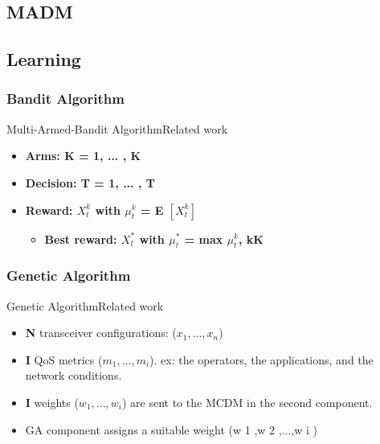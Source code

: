 \subsection{MADM}




\subsection{Learning}

\subsubsection{Bandit Algorithm}

\begin{frame}{Multi-Armed-Bandit Algorithm}{Related work}
\begin{itemize}
	\item \bf{Arms:} K = {1, ... , K}
	\item \bf{Decision:} T = {1, ... , T}
	\item \bf{Reward:} $X^{k}_{t}$ with $\mu^{k}_{t}$ = E $[X^{k}_{t}]$
	\begin{itemize}
		\item \bf{Best reward:} $X^{*}_{t}$ with $\mu^{*}_{t}$ = max $\mu^{k}_{t}$,  k\in  K
	\end{itemize}
\end{itemize}
\end{frame}

\subsubsection{Genetic Algorithm}

\begin{frame}{Genetic Algorithm}{Related work \cite{alkhawlani_access_2008a}}
\begin{itemize}
	\item \textbf{N} transceiver configurations: ($x_{1}, ..., x_{n}$)
	\item \textbf{I} QoS metrics ($m_{1}, ..., m_{i}$). ex: the operators, the applications, and the network conditions.
	\item \textbf{I} weights ($w_{1}, ..., w_{i}$) are sent to the MCDM in the second component.
	\item GA component assigns a suitable weight (w 1 ,w 2 ,...,w i )
\end{itemize}
\end{frame}


